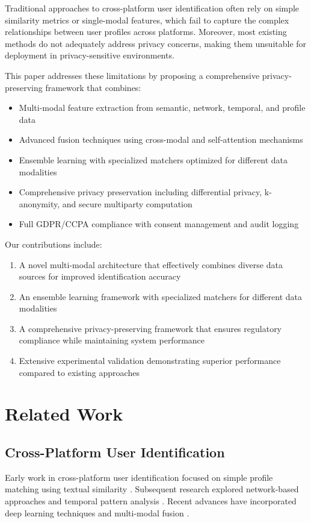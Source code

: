 \documentclass[conference]{IEEEtran}
\begin{document}
Traditional approaches to cross-platform user identification often rely on simple similarity metrics or single-modal features, which fail to capture the complex relationships between user profiles across platforms. Moreover, most existing methods do not adequately address privacy concerns, making them unsuitable for deployment in privacy-sensitive environments.

This paper addresses these limitations by proposing a comprehensive privacy-preserving framework that combines:
\begin{itemize}
\item Multi-modal feature extraction from semantic, network, temporal, and profile data
\item Advanced fusion techniques using cross-modal and self-attention mechanisms
\item Ensemble learning with specialized matchers optimized for different data modalities
\item Comprehensive privacy preservation including differential privacy, k-anonymity, and secure multiparty computation
\item Full GDPR/CCPA compliance with consent management and audit logging
\end{itemize}

Our contributions include:
\begin{enumerate}
\item A novel multi-modal architecture that effectively combines diverse data sources for improved identification accuracy
\item An ensemble learning framework with specialized matchers for different data modalities
\item A comprehensive privacy-preserving framework that ensures regulatory compliance while maintaining system performance
\item Extensive experimental validation demonstrating superior performance compared to existing approaches
\end{enumerate}

\section{Related Work}

\subsection{Cross-Platform User Identification}
Early work in cross-platform user identification focused on simple profile matching using textual similarity \cite{ref1}. Subsequent research explored network-based approaches \cite{ref2} and temporal pattern analysis \cite{ref3}. Recent advances have incorporated deep learning techniques \cite{ref4} and multi-modal fusion \cite{ref5}.
\end{document}

